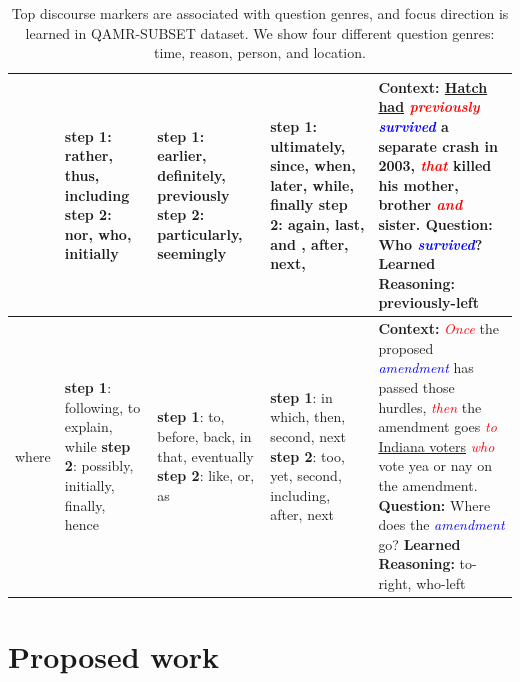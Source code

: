 \begin{table}[t]
{\begin{tabular}{|p{1.8cm}|p{2.5cm}|p{2.5cm}|p{2.5cm}|p{5.8cm}|}
	& \textbf{step 1}: rather, thus, including \newline\newline\textbf{step 2}: nor, who, initially &\textbf{step 1}: earlier, definitely, previously \newline\newline\textbf{step 2}: particularly, seemingly
		&\textbf{step 1}: ultimately, since, when, later, while, finally \newline \textbf{step 2}:  again, last, and , after, next, 
	& \textbf{Context: }\underline{Hatch had} \textit{\textcolor{red}{previously}} \textit{\textcolor{blue}{survived}} a separate crash in 2003, \textit{\textcolor{red}{that}} killed his mother, brother \textit{\textcolor{red}{and}} sister.
  \newline \textbf{Question: }Who \textit{\textcolor{blue}{survived}}?\newline \textbf{Learned Reasoning: }previously-left\\ 
	\hline
  where 
 
  
	 &\textbf{step 1}: following, to explain, while \newline\newline\textbf{step 2}: possibly, initially, finally, hence &\textbf{step 1}: to, before, back, in that, eventually \newline\textbf{step 2}: like, or, as & \textbf{step 1}: in which, then, second, next \newline\newline \textbf{step 2}: too, yet, second, including, after, next
  & \textbf{Context: }\textit{\textcolor{red}{Once}} the proposed \textit{\textcolor{blue}{amendment}} has passed those hurdles, \textit{\textcolor{red}{then}} the amendment goes \textit{\textcolor{red}{to}} \underline{Indiana voters} \textit{\textcolor{red}{who}} vote yea or nay on the amendment. 
  \newline \textbf{Question: }Where does the \textit{\textcolor{blue}{amendment}} go?
  \newline \textbf{Learned Reasoning: }to-right, who-left\\ 
 \hline
\end{tabular}
}
\caption{Top discourse markers are associated with question genres, and focus direction is learned in \textsc{QAMR-SUBSET} dataset. We show four different question genres: time, reason, person, and location.}
\label{tab:disc_phrase}
\end{table}

\section{Proposed work}

